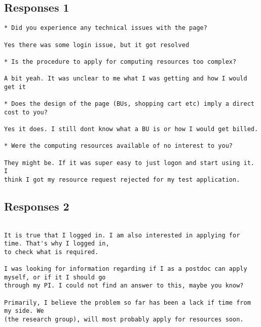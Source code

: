 \subsection*{Responses 1}
\begin{verbatim}
* Did you experience any technical issues with the page?

Yes there was some login issue, but it got resolved

* Is the procedure to apply for computing resources too complex?

A bit yeah. It was unclear to me what I was getting and how I would get it

* Does the design of the page (BUs, shopping cart etc) imply a direct
cost to you?

Yes it does. I still dont know what a BU is or how I would get billed.

* Were the computing resources available of no interest to you?

They might be. If it was super easy to just logon and start using it. I
think I got my resource request rejected for my test application.

\end{verbatim}

\subsection*{Responses 2}
\begin{verbatim}

It is true that I logged in. I am also interested in applying for time. That's why I logged in, 
to check what is required.

I was looking for information regarding if I as a postdoc can apply myself, or if it I should go 
through my PI. I could not find an answer to this, maybe you know?

Primarily, I believe the problem so far has been a lack if time from my side. We 
(the research group), will most probably apply for resources soon.
\end{verbatim}

